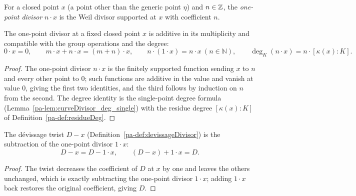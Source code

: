 \begin{definition}
  \label{pa-def:curveDivisor_single}
  \leanok

  For a closed point \(x\) (a point other than the generic point \(\eta\)) and \(n \in \mathbb{Z}\), the
  \emph{one-point divisor} \(n \cdot x\) is the Weil divisor supported at \(x\) with coefficient
  \(n\).
\end{definition}

\begin{lemma}
  \label{pa-lem:curveDivisor_single_arith}
  \leanok

  The one-point divisor at a fixed closed point \(x\) is additive in its multiplicity and
  compatible with the group operations and the degree:
  \[
    0 \cdot x = 0, \qquad m \cdot x + n \cdot x = (m+n)\cdot x, \qquad
    n \cdot (1 \cdot x) = n \cdot x \ (n \in \mathbb N), \qquad
    \deg_K(n \cdot x) = n \cdot [\kappa(x):K].
  \]
\end{lemma}
\begin{proof}
  \leanok
  The one-point divisor \(n \cdot x\) is the finitely supported function sending \(x\) to \(n\)
  and every other point to \(0\); such functions are additive in the value and vanish at value
  \(0\), giving the first two identities, and the third follows by induction on \(n\) from the
  second. The degree identity is the single-point degree formula
  (Lemma~\ref{pa-lem:curveDivisor_deg_single}) with the residue degree
  \([\kappa(x):K]\) of Definition~\ref{pa-def:residueDeg}.
\end{proof}

\begin{lemma}
  \label{pa-lem:devissageDivisor_sub}
  \leanok

  The dévissage twist \(D - x\) (Definition~\ref{pa-def:devissageDivisor}) is the subtraction of the
  one-point divisor \(1 \cdot x\):
  \[
    D - x = D - 1 \cdot x, \qquad (D - x) + 1\cdot x = D .
  \]
\end{lemma}
\begin{proof}
  \leanok
  The twist decreases the coefficient of \(D\) at \(x\) by one and leaves the others unchanged,
  which is exactly subtracting the one-point divisor \(1 \cdot x\); adding \(1 \cdot x\) back
  restores the original coefficient, giving \(D\).
\end{proof}

